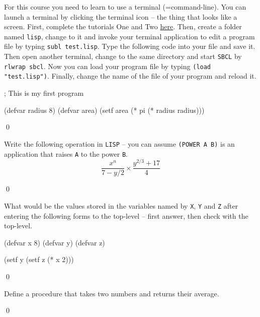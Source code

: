 \documentclass[a4paper,11pt]{article}
\begin{document}
\noindent\hrulefill

\begin{uexercise}
For this course you need to learn to use a terminal (=command-line). You can launch a terminal by clicking the terminal icon -- the thing that looks like a screen.
First, complete the tutorials One and Two \href{http://www.ee.surrey.ac.uk/Teaching/Unix/}{here}.
Then, create a folder named \Verb+lisp+, change to it and invoke your terminal application to edit a program file by typing \Verb+subl test.lisp+. Type the following code into your file and save it. Then open another terminal, change to the same directory and start \Verb+SBCL+ by \Verb+rlwrap sbcl+. Now you can load your program file by typing \Verb+(load "test.lisp")+. Finally, change the name of the file of your program and reload it. 

\begin{lispcode}
; This is my first program

(defvar radius 8)
(defvar area)
(setf area (* pi (* radius radius)))
\end{lispcode}

\qed
\end{uexercise}

\begin{uexercise}
Write the following operation in \Verb+LISP+ -- you can assume \Verb+(POWER A B)+ is an application that raises \Verb+A+ to the power \Verb+B+.
$$ \frac{x^n}{7 - y/2} \times \frac{y^{2/3} + 17}{4} $$

\qed
\end{uexercise}

\begin{uexercise}
What would be the values stored in the variables named by \Verb+X+, \Verb+Y+ and \Verb+Z+ after entering the following forms to the top-level -- first answer, then check with the top-level. 

\begin{lispcode}
(defvar x 8)
(defvar y)
(defvar z)

(setf y (setf z (* x 2)))
\end{lispcode}

\qed
\end{uexercise}

\begin{uexercise}
Define a procedure that takes two numbers and returns their average.

\qed
\end{uexercise}
\end{document}
